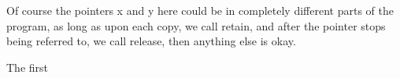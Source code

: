 \documentclass{article}
\begin{document}
Of course the pointers x and y here could be in completely different parts of the program, as long as upon each copy, we call retain, and after the pointer stops being referred to, we call release, then anything else is okay.

The first 





\end{document}
